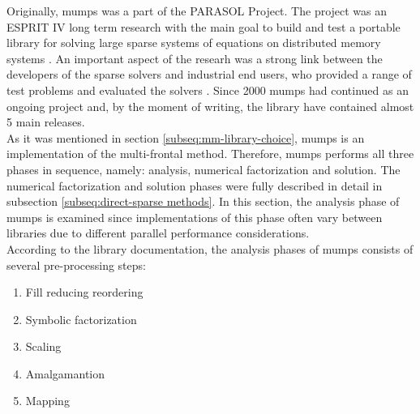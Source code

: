 \label{subseq:mumps-review}

Originally, \acrfull{mumps} was a part of the PARASOL Project. The project was an ESPRIT IV long term research with the main goal to build and test a portable library for solving large sparse systems of equations on distributed memory systems \cite{PARASOL}. An important aspect of the researh was a strong link between the developers of the sparse solvers and industrial end users, who provided a range of test problems and evaluated the solvers \cite{MUMPS:description}. Since 2000 \acrshort{mumps} had continued as an ongoing project and, by the moment of writing, the library have contained almost 5 main releases.\\



As it was mentioned in section \ref{subseq:mm-library-choice}, \acrshort{mumps} is an implementation of the multi-frontal method. Therefore, \acrshort{mumps} performs all three phases in sequence, namely: analysis, numerical factorization and solution. The numerical factorization and solution phases were fully described in detail in subsection \ref{subseq:direct-sparse methods}. In this section, the analysis phase of \acrshort{mumps} is examined since implementations of this phase often vary between libraries due to different parallel performance considerations.\\


According to the library documentation, the analysis phases of \acrshort{mumps} consists of several pre-processing steps:

\begin{enumerate}
  \item Fill reducing reordering \label{mumps:analysis-steps:1}
  \item Symbolic factorization \label{mumps:analysis-steps:2}
  \item Scaling \label{mumps:analysis-steps:3}
  \item Amalgamantion \label{mumps:analysis-steps:4}
  \item Mapping \label{mumps:analysis-steps:5}
\end{enumerate}


